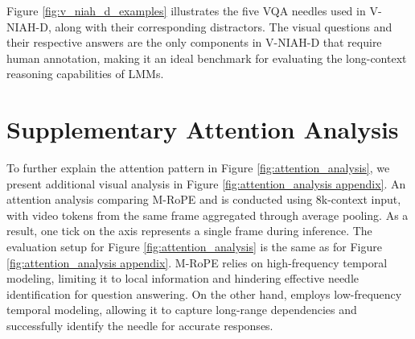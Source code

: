 % 





Figure \ref{fig:v_niah_d_examples} illustrates the five VQA needles used in V-NIAH-D, along with their corresponding distractors. The visual questions and their respective answers are the only components in V-NIAH-D that require human annotation, making it an ideal benchmark for evaluating the long-context reasoning capabilities of LMMs.  



\section{Supplementary Attention Analysis}\label{app:attention_analysis}
To further explain the attention pattern in Figure \ref{fig:attention_analysis}, we present additional visual analysis in Figure \ref{fig:attention_analysis appendix}. An attention analysis comparing M-RoPE and \methodname is conducted using 8k-context input, with video tokens from the same frame aggregated through average pooling. As a result, one tick on the axis represents a single frame during inference. The evaluation setup for Figure \ref{fig:attention_analysis} is the same as for Figure \ref{fig:attention_analysis appendix}. M-RoPE relies on high-frequency temporal modeling, limiting it to local information and hindering effective needle identification for question answering. On the other hand, \methodname employs low-frequency temporal modeling, allowing it to capture long-range dependencies and successfully identify the needle for accurate responses.


